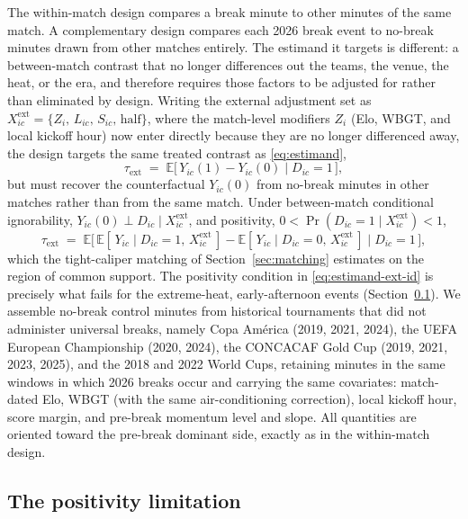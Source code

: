 \documentclass[11pt]{article}
\newcommand{\E}{\mathbb{E}}
\begin{document}
The within-match design compares a break minute to other minutes of the same match. A complementary design
compares each 2026 break event to no-break minutes drawn from other matches entirely. The estimand it targets
is different: a between-match contrast that no longer differences out the teams, the venue, the heat, or the
era, and therefore requires those factors to be adjusted for rather than eliminated by design. Writing the
external adjustment set as $X^{\text{ext}}_{ic}=\{Z_i,\,L_{ic},\,S_{ic},\,\text{half}\}$, where the match-level
modifiers $Z_i$ (Elo, WBGT, and local kickoff hour) now enter directly because they are no longer differenced
away, the design targets the same treated contrast as \eqref{eq:estimand},
\begin{equation}
\tau_{\text{ext}} \;=\; \E\big[\,Y_{ic}(1)-Y_{ic}(0)\;\big|\;D_{ic}=1\,\big],
\label{eq:estimand-ext}
\end{equation}
but must recover the counterfactual $Y_{ic}(0)$ from no-break minutes in other matches rather than from the same
match. Under between-match conditional ignorability, $Y_{ic}(0)\perp D_{ic}\mid X^{\text{ext}}_{ic}$, and
positivity, $0<\Pr(D_{ic}=1\mid X^{\text{ext}}_{ic})<1$,
\begin{equation}
\tau_{\text{ext}} \;=\; \E\big[\,\E[\,Y_{ic}\mid D_{ic}=1,\,X^{\text{ext}}_{ic}\,]-\E[\,Y_{ic}\mid D_{ic}=0,\,X^{\text{ext}}_{ic}\,]\;\big|\;D_{ic}=1\,\big],
\label{eq:estimand-ext-id}
\end{equation}
which the tight-caliper matching of Section~\ref{sec:matching} estimates on the region of common support. The
positivity condition in \eqref{eq:estimand-ext-id} is precisely what fails for the extreme-heat, early-afternoon
events (Section~\ref{sec:positivity}). We assemble
no-break control minutes from historical tournaments that did not administer universal breaks, namely Copa
Am\'erica (2019, 2021, 2024), the UEFA European Championship (2020, 2024), the CONCACAF Gold Cup (2019, 2021,
2023, 2025), and the 2018 and 2022 World Cups, retaining minutes in the same windows in which 2026 breaks
occur and carrying the same covariates: match-dated Elo, WBGT (with the same air-conditioning correction),
local kickoff hour, score margin, and pre-break momentum level and slope. All quantities are oriented toward
the pre-break dominant side, exactly as in the within-match design.

\subsection{The positivity limitation}
\label{sec:positivity}
\end{document}

